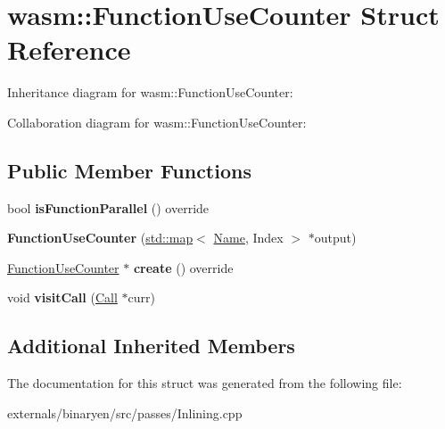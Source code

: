 \hypertarget{structwasm_1_1_function_use_counter}{}\section{wasm\+:\+:Function\+Use\+Counter Struct Reference}
\label{structwasm_1_1_function_use_counter}


Inheritance diagram for wasm\+:\+:Function\+Use\+Counter\+:


Collaboration diagram for wasm\+:\+:Function\+Use\+Counter\+:
\subsection*{Public Member Functions}
\begin{DoxyCompactItemize}
\item 
\mbox{\label{structwasm_1_1_function_use_counter_acb1cc4a6ac4ccd5421f39854c5b386d8}} 
bool {\bfseries is\+Function\+Parallel} () override
\item 
\mbox{\label{structwasm_1_1_function_use_counter_a37e68751b148d808261778d37a9b64af}} 
{\bfseries Function\+Use\+Counter} (\mbox{\hyperlink{classstd_1_1map}{std\+::map}}$<$ \mbox{\hyperlink{structwasm_1_1_name}{Name}}, Index $>$ $\ast$output)
\item 
\mbox{\label{structwasm_1_1_function_use_counter_ad1f5eefad6638972ba198d02199fa0c1}} 
\mbox{\hyperlink{structwasm_1_1_function_use_counter}{Function\+Use\+Counter}} $\ast$ {\bfseries create} () override
\item 
\mbox{\label{structwasm_1_1_function_use_counter_a9ffa95e1f948dc55629fe879f270ea97}} 
void {\bfseries visit\+Call} (\mbox{\hyperlink{classwasm_1_1_call}{Call}} $\ast$curr)
\end{DoxyCompactItemize}
\subsection*{Additional Inherited Members}


The documentation for this struct was generated from the following file\+:\begin{DoxyCompactItemize}
\item 
externals/binaryen/src/passes/Inlining.\+cpp\end{DoxyCompactItemize}
